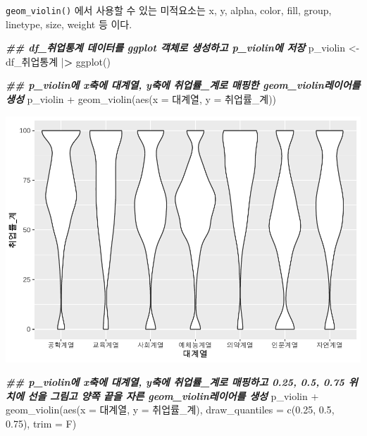 \documentclass[
]{article}
\newenvironment{Shaded}{\begin{snugshade}}{\end{snugshade}}
\newcommand{\AttributeTok}[1]{\textcolor[rgb]{0.77,0.63,0.00}{#1}}
\newcommand{\DocumentationTok}[1]{\textcolor[rgb]{0.56,0.35,0.01}{\textbf{\textit{#1}}}}
\newcommand{\ErrorTok}[1]{\textcolor[rgb]{0.64,0.00,0.00}{\textbf{#1}}}
\newcommand{\FloatTok}[1]{\textcolor[rgb]{0.00,0.00,0.81}{#1}}
\newcommand{\FunctionTok}[1]{\textcolor[rgb]{0.00,0.00,0.00}{#1}}
\newcommand{\NormalTok}[1]{#1}
\newcommand{\OtherTok}[1]{\textcolor[rgb]{0.56,0.35,0.01}{#1}}
\newcommand{\SpecialCharTok}[1]{\textcolor[rgb]{0.00,0.00,0.00}{#1}}
\begin{document}
\texttt{geom\_violin()} 에서 사용할 수 있는 미적요소는 x, y, alpha, color, fill, group, linetype, size, weight 등 이다.

\begin{Shaded}
\begin{Highlighting}[]
\DocumentationTok{\#\#  df\_취업통계 데이터를 ggplot 객체로 생성하고 p\_violin에 저장}
\NormalTok{p\_violin }\OtherTok{\textless{}{-}}\NormalTok{ df\_취업통계 }\SpecialCharTok{|}\ErrorTok{\textgreater{}}
  \FunctionTok{ggplot}\NormalTok{()}

\DocumentationTok{\#\# p\_violin에 x축에 대계열, y축에 취업률\_계로 매핑한 geom\_violin레이어를 생성}
\NormalTok{p\_violin }\SpecialCharTok{+} 
  \FunctionTok{geom\_violin}\NormalTok{(}\FunctionTok{aes}\NormalTok{(}\AttributeTok{x =}\NormalTok{ 대계열, }\AttributeTok{y =}\NormalTok{ 취업률\_계)) }
\end{Highlighting}
\end{Shaded}

\includegraphics{chap3_files/figure-latex/unnamed-chunk-40-1.pdf}

\begin{Shaded}
\begin{Highlighting}[]
\DocumentationTok{\#\# p\_violin에 x축에 대계열, y축에 취업률\_계로 매핑하고 0.25, 0.5, 0.75 위치에 선을 그림고 양쪽 끝을 자른 geom\_violin레이어를 생성}
\NormalTok{p\_violin }\SpecialCharTok{+} 
  \FunctionTok{geom\_violin}\NormalTok{(}\FunctionTok{aes}\NormalTok{(}\AttributeTok{x =}\NormalTok{ 대계열, }\AttributeTok{y =}\NormalTok{ 취업률\_계), }\AttributeTok{draw\_quantiles =} \FunctionTok{c}\NormalTok{(}\FloatTok{0.25}\NormalTok{, }\FloatTok{0.5}\NormalTok{, }\FloatTok{0.75}\NormalTok{), }\AttributeTok{trim =}\NormalTok{ F) }
\end{Highlighting}
\end{Shaded}
\end{document}
